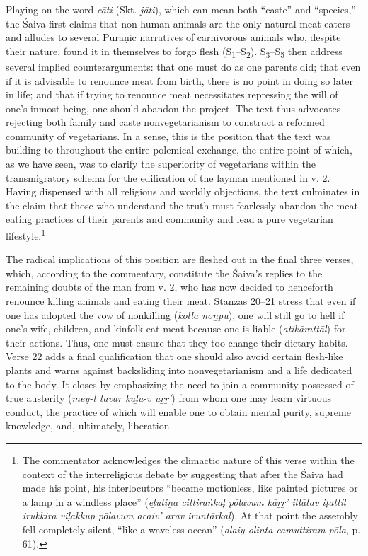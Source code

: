 Playing on the word \emph{cāti} (Skt. \emph{jāti}), which can mean both “caste” and “species,” the Śaiva first claims that non-human animals are the only natural meat eaters and alludes to several Purāṇic narratives of carnivorous animals who, despite their nature, found it in themselves to forgo flesh (S\textsubscript{1}–S\textsubscript{2}). S\textsubscript{3}–S\textsubscript{5} then address several implied counterarguments: that one must do as one parents did; that even if it is advisable to renounce meat from birth, there is no point in doing so later in life; and that if trying to renounce meat necessitates repressing the will of one’s inmost being, one should abandon the project. The text thus advocates rejecting both family and caste nonvegetarianism to construct a reformed community of vegetarians. In a sense, this is the position that the text was building to throughout the entire polemical exchange, the entire point of which, as we have seen, was to clarify the superiority of vegetarians within the transmigratory schema for the edification of the layman mentioned in v. 2. Having dispensed with all religious and worldly objections, the text culminates in the claim that those who understand the truth must fearlessly abandon the meat-eating practices of their parents and community and lead a pure vegetarian lifestyle.\footnote{%
The commentator acknowledges the climactic nature of this verse within the context of the interreligious debate by suggesting that after the Śaiva had made his point, his interlocutors “became motionless, like painted pictures or a lamp in a windless place” (\emph{eḻutiṉa cittiraṅkaḷ pōlavum kāṟṟ’ illātav iṭattil irukkiṟa viḷakkup pōlavum acaiv’ aṟav iruntārkaḷ}). At that point the assembly fell completely silent, “like a waveless ocean” (\emph{alaiy oḻinta camuttiram pōla}, p. 61).
}



The radical implications of this position are fleshed out in the final three verses, which, according to the commentary, constitute the Śaiva’s replies to the remaining doubts of the man from v. 2, who has now decided to henceforth renounce killing animals and eating their meat. Stanzas 20–21 stress that even if one has adopted the vow of nonkilling (\emph{kollā noṉpu}), one will still go to hell if one’s wife, children, and kinfolk eat meat because one is liable (\emph{atikārattāl}) for their actions. Thus, one must ensure that they too change their dietary habits. Verse 22 adds a final qualification that one should also avoid certain flesh-like plants and warns against backsliding into nonvegetarianism and a life dedicated to the body. It closes by emphasizing the need to join a community possessed of true austerity (\emph{mey-t tavar kuḻu-v uṟṟ’}) from whom one may learn virtuous conduct, the practice of which will enable one to obtain mental purity, supreme knowledge, and, ultimately, liberation. 


